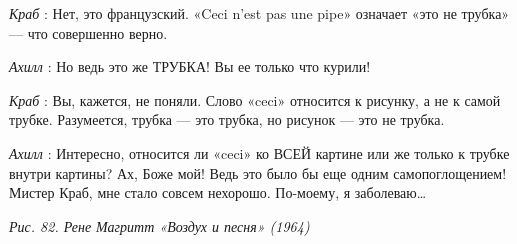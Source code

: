 \documentclass[../main.tex]{subfiles}
\begin{document}
\begin{dialogue}
\emph{Краб} : Нет, это французский. «Ceci n'est pas une pipe» означает «это не трубка» --- что совершенно верно.

\emph{Ахилл} : Но ведь это же ТРУБКА! Вы ее только что курили!

\emph{Краб} : Вы, кажется, не поняли. Слово «ceci» относится к рисунку, а не к самой трубке. Разумеется, трубка --- это трубка, но рисунок --- это не трубка.

\emph{Ахилл} : Интересно, относится ли «ceci» ко ВСЕЙ картине или же только к трубке внутри картины? Ах, Боже мой! Ведь это было бы еще одним самопоглощением! Мистер Краб, мне стало совсем нехорошо. По-моему, я заболеваю\ldots{}

\emph{Рис. 82. Рене Магритт «Воздух и песня» (1964)}

\end{dialogue}
\end{document}
